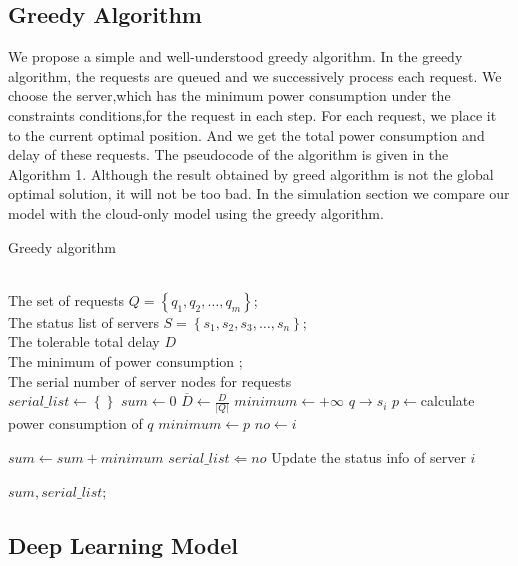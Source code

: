 \documentclass[journal]{IEEEtran}
\begin{document}
\subsection{Greedy Algorithm}
We propose a simple and well-understood greedy algorithm\cite{18}. In the greedy algorithm, the requests are queued and we successively process each request. We choose the server,which has the minimum power consumption under the constraints conditions,for the request in each step. For each request, we place it to the current optimal position. And we get the total power consumption  and delay of these requests. The pseudocode of the algorithm is given in the Algorithm 1. Although the result obtained by greed algorithm is not the global optimal solution, it will not be too bad.  In the simulation section we compare our model with the cloud-only model using the greedy algorithm. 
\begin{algorithm}[htb]   
\caption{Greedy algorithm}   
\label{alg:Framwork}   
\begin{algorithmic}[1] %
\REQUIRE ~~\\ %
The set of requests  $\mathit{Q}=\left\{q_1,q_2,\dots,q_m \right\} $;\\  
The status list of servers $S=\left\{s_1,s_2,s_3,\dots,s_n \right\}$;\\ 
The tolerable total delay $D$
\ENSURE ~~\\ %
The minimum of power consumption ;\\
The serial number of server nodes for requests \\ 
\STATE $serial\_list \leftarrow \left\{ \right\}$
\STATE $sum \leftarrow 0$
\STATE $\overline{D} \leftarrow \frac{D}{\left|Q\right|}$
\STATE $minimum \leftarrow +\infty$
\STATE $q \rightarrow s_i$
\STATE  $p \leftarrow $calculate power consumption of $q$
\STATE $minimum \leftarrow p$
\STATE $no \leftarrow i$
\ENDIF
\ENDIF 

\ENDFOR
\STATE $sum \leftarrow sum+minimum$ 
\STATE $serial\_list \Leftarrow no $
\STATE Update the status info of server $i$
\ENDFOR
  
\RETURN $sum,serial\_list$; %
\end{algorithmic}  
\end{algorithm}  

\subsection{Deep Learning Model}
\end{document}
